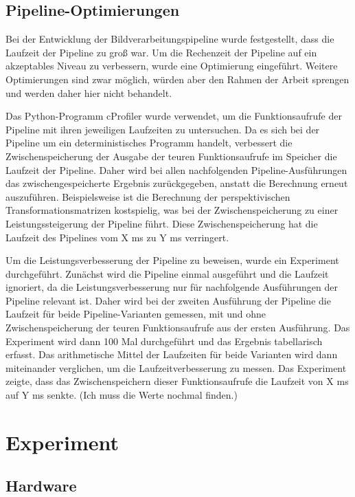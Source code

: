 \documentclass[arbeit=studie,oneside,BCOR=12mm]{ArbeitRST}
\begin{document}
\section{Pipeline-Optimierungen}

Bei der Entwicklung der Bildverarbeitungspipeline wurde festgestellt, dass die
Laufzeit der Pipeline zu gro{\ss} war. Um die Rechenzeit der Pipeline auf ein
akzeptables Niveau zu verbessern, wurde eine Optimierung eingeführt. Weitere
Optimierungen sind zwar möglich, würden aber den Rahmen der Arbeit sprengen und
werden daher hier nicht behandelt.

Das Python-Programm cProfiler wurde verwendet, um die Funktionsaufrufe der
Pipeline mit ihren jeweiligen Laufzeiten zu untersuchen. Da es sich bei der
Pipeline um ein deterministisches Programm handelt, verbessert die
Zwischenspeicherung der Ausgabe der teuren Funktionsaufrufe im Speicher die
Laufzeit der Pipeline. Daher wird bei allen nachfolgenden Pipeline-Ausführungen
das zwischengespeicherte Ergebnis zurückgegeben, anstatt die Berechnung erneut
auszuführen. Beispielsweise ist die Berechnung der perspektivischen
Transformationsmatrizen kostspielig, was bei der Zwischenspeicherung zu einer
Leistungssteigerung der Pipeline führt. Diese Zwischenspeicherung hat die Laufzeit 
des Pipelines vom X ms zu Y ms verringert.

Um die Leistungsverbesserung der Pipeline zu beweisen, wurde ein Experiment
durchgeführt. Zunächst wird die Pipeline einmal ausgeführt und die Laufzeit
ignoriert, da die Leistungsverbesserung nur für nachfolgende Ausführungen der
Pipeline relevant ist. Daher wird bei der zweiten Ausführung der Pipeline die
Laufzeit für beide Pipeline-Varianten gemessen, mit und ohne
Zwischenspeicherung der teuren Funktionsaufrufe aus der ersten Ausführung. Das
Experiment wird dann 100 Mal durchgeführt und das Ergebnis tabellarisch
erfasst. Das arithmetische Mittel der Laufzeiten für beide Varianten wird dann
miteinander verglichen, um die Laufzeitverbesserung zu messen. Das Experiment
zeigte, dass das Zwischenspeichern dieser Funktionsaufrufe die Laufzeit von X
ms auf Y ms senkte. (Ich muss die Werte nochmal finden.)


\chapter{Experiment}
\section{Hardware}
\end{document}
